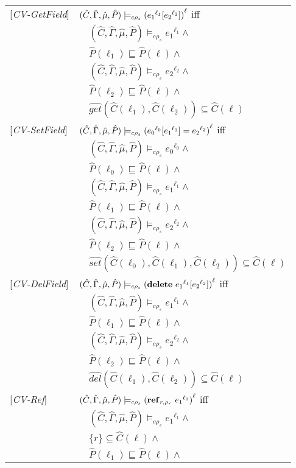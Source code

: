 \documentclass[[12pt,a4paper,twoside,openrigh]{article}
\newcommand{\Cat}[0]{\hat{C}}
\newcommand{\muat}[0]{\hat{\mu}}
\newcommand{\Env}[0]{\hat{\Gamma}}
\newcommand{\Pat}[0]{\hat{P}}
\newcommand{\cenvs}{(\Cat,\Env,\muat,\Pat)}
\newcommand{\ccest}[1]{\cenvs \models_{c \rho_s} #1}
\newcommand{\ccestl}[1]{\cenvs \models_{c \rho_s} {(#1)}^{\ell}}
\newcommand{\lbt}[1]{{e_#1}^{\ell_#1}}
\begin{document}
\begin{tabular} {l l l l}
{[\textit{CV-GetField}]}&\multicolumn{3}{l}{$\ccestl {\lookup {\lbt 1} {\lbt 2}} $ iff}\\
&&\multicolumn{2}{l}{$ \ccest {\lbt1} \wedge $}\\
&&\multicolumn{2}{l}{$\Pat(\ell_1) \sqsubseteq \Pat(\ell) \wedge$} \\
&&\multicolumn{2}{l}{$ \ccest {\lbt 2} \wedge $} \\
&&\multicolumn{2}{l}{$\Pat(\ell_2) \sqsubseteq \Pat(\ell) \wedge$} \\
&&\multicolumn{2}{l}{$\widehat{get} (\Cat(\ell_1), \Cat(\ell_2)) \subseteq \Cat(\ell)$} \\
{[\textit{CV-SetField}]}&\multicolumn{3}{l}{$\ccestl {\store {\lbt 0} {\lbt 1} {\lbt 2}} $ iff}\\
&&\multicolumn{2}{l}{$ \ccest {\lbt 0} \wedge $}\\
&&\multicolumn{2}{l}{$\Pat(\ell_0) \sqsubseteq \Pat(\ell) \wedge$} \\
&&\multicolumn{2}{l}{$ \ccest {\lbt 1} \wedge $} \\
&&\multicolumn{2}{l}{$\Pat(\ell_1) \sqsubseteq \Pat(\ell) \wedge$} \\
&&\multicolumn{2}{l}{$ \ccest {\lbt 2} \wedge $} \\
&&\multicolumn{2}{l}{$\Pat(\ell_2) \sqsubseteq \Pat(\ell) \wedge$} \\
&&\multicolumn{2}{l}{$\widehat{set} (\Cat(\ell_0), \Cat(\ell_1), \Cat(\ell_2)) \subseteq \Cat(\ell)$} \\
{[\textit{CV-DelField}]}&\multicolumn{3}{l}{$\ccestl {\delete {\lbt 1} {\lbt 2}} $ iff}\\ 
&&\multicolumn{2}{l}{$ \ccest {\lbt 1} \wedge $}\\
&&\multicolumn{2}{l}{$\Pat(\ell_1) \sqsubseteq \Pat(\ell) \wedge$} \\
&&\multicolumn{2}{l}{$ \ccest {\lbt 2} \wedge $} \\
&&\multicolumn{2}{l}{$\Pat(\ell_2) \sqsubseteq \Pat(\ell) \wedge$} \\
&&\multicolumn{2}{l}{$\widehat{del} (\Cat(\ell_1), \Cat(\ell_2)) \subseteq \Cat(\ell)$}\\
{[\textit{CV-Ref}]}&\multicolumn{3}{l}{$ \ccestl {\newref {r,\rho_r} {\lbt 1}} $ iff}\\
&&\multicolumn{2}{l}{$\ccest {\lbt 1} \wedge $}\\
&&\multicolumn{2}{l}{$\{r\} \subseteq \Cat(\ell) \wedge$}\\
&&\multicolumn{2}{l}{$\Pat(\ell_1) \sqsubseteq \Pat(\ell) \wedge$}\\

\end{tabular}
\end{document}
